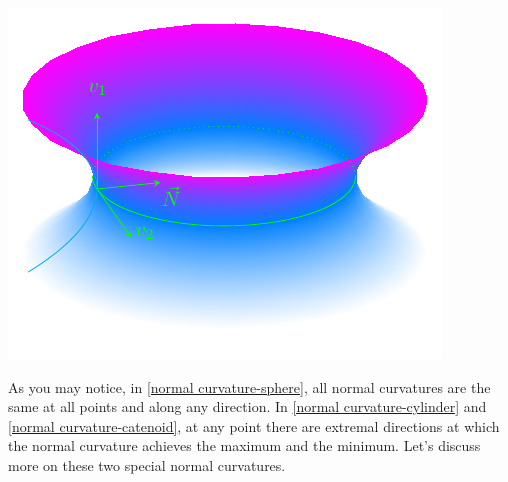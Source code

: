 \begin{center}

    \includegraphics{picture/week7/catenoid-cool.pdf}
        \end{center}
    As you may notice, in \cref{normal curvature-sphere}, all 
    normal curvatures are the same at all points and along any 
    direction. In \cref{normal curvature-cylinder} and 
    \cref{normal curvature-catenoid}, at any point there are extremal
    directions at which the normal curvature achieves 
    the maximum and the minimum. Let's discuss more on these two special 
    normal curvatures.
